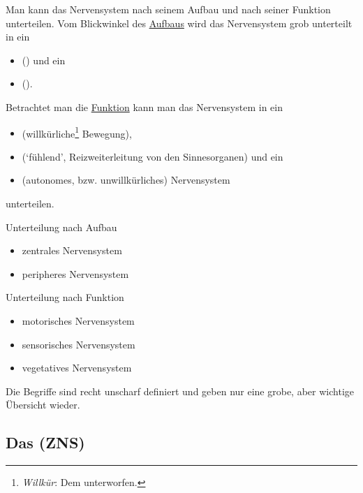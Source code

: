 


{%
Man kann das Nervensystem nach seinem Aufbau und nach seiner
Funktion unterteilen.
Vom Blickwinkel des \underline{Aufbaus} wird das Nervensystem grob
unterteilt in ein

\begin{itemize}
\item {} () und ein 
\item {} ().
\end{itemize}




\noindent Betrachtet man die \underline{Funktion} kann man das
Nervensystem in ein
\begin{itemize}
  \item {}
  (willkürliche\footnote{\emph{Willkür}: Dem  unterworfen.} Bewegung),
  \item {}
  (\protect\enquote*{fühlend}, Reizweiterleitung von den
  Sinnesorganen) und ein
  \item {}
  (autonomes, bzw.
  unwillkürliches) Nervensystem
\end{itemize}
unterteilen. 
}
{
Unterteilung nach Aufbau
\begin{itemize}
  \item zentrales Nervensystem
  \item peripheres Nervensystem
\end{itemize}
Unterteilung nach Funktion
\begin{itemize}
  \item motorisches Nervensystem
  \item sensorisches Nervensystem
  \item vegetatives Nervensystem
\end{itemize}
Die Begriffe sind recht unscharf definiert und geben nur
eine grobe, aber wichtige Übersicht
wieder.
}
{}{}{}

\subsection{Das  (ZNS)}
\label{topic:zns}

